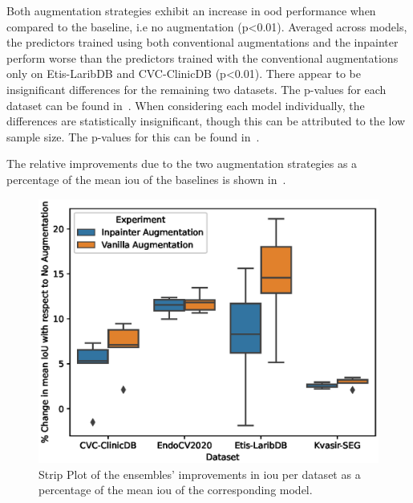 Both augmentation strategies exhibit an increase in \gls{ood} performance when compared to the baseline, i.e no augmentation (p<0.01). Averaged across models, the predictors trained using both conventional augmentations and the inpainter perform worse than the predictors trained with the conventional augmentations only on Etis-LaribDB and CVC-ClinicDB (p<0.01). There appear to be insignificant differences for the remaining two datasets. The p-values for each dataset can be found in~. When considering each model individually, the differences are statistically insignificant, though this can be attributed to the low sample size. The p-values for this can be found in~. 

The relative improvements due to the two augmentation strategies as a percentage of the mean \gls{iou} of the baselines is shown in~. 

\begin{figure}[htb]
    \centering
    \includegraphics[width=\linewidth]{illustrations/augmentation_plot.eps}
    \caption[Augmentation Improvements]{Strip Plot of the ensembles' improvements in \gls{iou} per dataset as a percentage of the mean \gls{iou} of the corresponding model.}
    \label{fig:augmentations}
\end{figure}

